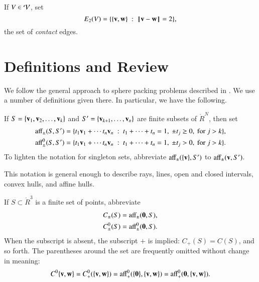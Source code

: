 \documentclass{llncs}
\def\op#1{{\hbox{#1}}}
\begin{document}
If $V\in {\mathcal V}$, set 
\[
E_2(V)=\{\{\v,\w\} \mid \norm{\v}{\w}=2\},
\]
the set of {\it contact} edges.




\section{Definitions and Review}

We follow the general approach to sphere packing problems described in
\cite{DSP}.  We use a number of definitions given there.  In
particular, we have the following.

\begin{definition}[affine]\label{def:aff} 
  If $S = \{{\mathbf v}_1,{\mathbf v}_2,\ldots,{\mathbf v}_k\}$ and $S'=\{{\mathbf v}_{k+1},\ldots,{\mathbf v}_n\}$
  are finite subsets of $\ring{R}^N$, then set
	\begin{align*}
\op{aff}_{\pm} (S,S') &= \{t_1 \v_1 +\cdots t_n \v_n \mid
	t_1 +\cdots+t_n = 1,~ \pm t_j \ge 0, \text{ for } j>k\},\\
\op{aff}^0_{\pm} (S,S') &= \{t_1 \v_1 +\cdots t_n \v_n \mid
	t_1 +\cdots+t_n = 1,~ \pm t_j > 0, \text{ for } j>k\}.
		\end{align*}
To lighten the notation for singleton sets, abbreviate
$\op{aff}_\pm(\{\v\},S')$ to $\op{aff}_\pm(\v,S')$.
\indy{Notation}{aff2@$\op{aff}_{\pm}$, $\op{aff}^0_{\pm}$}%
%
%
\end{definition}

This notation is general enough to describe rays, lines, open and closed intervals,
convex hulls, and affine hulls.


If $S\subset\ring{R}^3$ is a finite set of points,
abbreviate
\begin{align*}
C_\pm(S) &= \op{aff}_\pm(\orz,S),\\
C^0_\pm(S) &= \op{aff}^0_\pm(\orz,S).\\
\end{align*}
When the subscript is absent, the subscript $+$ is implied: $C_+(S)
= C(S)$, and so forth.  The parentheses around the set are frequently
omitted without change in meaning:
\[ C^0\{\v,\w\}=C^0_+(\{\v,\w\}) =
\op{aff}^0_+(\{\orz\},\{\v,\w\}) = \op{aff}_+^0(\orz,\{\v,\w\}).\] 
\end{document}
